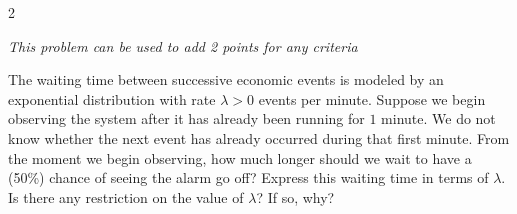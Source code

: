 \begin{multicols}{2}
		{
			
			\begin{center}
				\textit{This problem can be used to add 2 points for any criteria}
			\end{center}
			The waiting time between successive economic events is modeled by an exponential distribution with rate $\lambda>0$ events per minute. Suppose we begin observing the system after it has already been running for $1$ minute. We do not know whether the next event has already occurred during that first minute. From the moment we begin observing, how much longer should we wait to have a (50\%) chance of seeing the alarm go off? Express this waiting time in terms of $\lambda$. Is there any
			restriction on the value of \(\lambda \)? If so, why?
		}
		
	\end{multicols}
	
